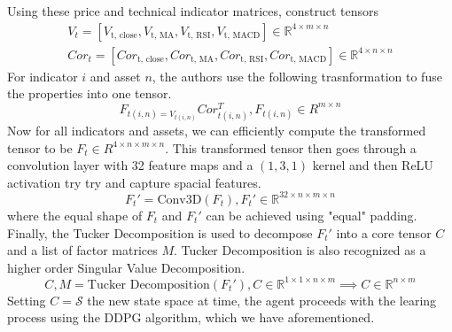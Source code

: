 Using these price and technical indicator matrices, construct tensors 
\begin{align*}
  V_t = [V_{\text{t, close}}, V_{\text{t, MA}}, V_{\text{t, RSI}}, V_{\text{t, MACD}}] \in \mathbb{R}^{4 \times m \times n}\\
  Cor_t = [Cor_{\text{t, close}}, Cor_{\text{t, MA}}, Cor_{\text{t, RSI}}, Cor_{\text{t, MACD}}] \in \mathbb{R}^{4 \times n \times n}
\end{align*}
For indicator $i$ and asset $n$, the authors use the following trasnformation to fuse the properties 
into one tensor. 
\[F_{t(i, n) = V_{t(i, n)}} Cor^T_{t(i, n)}, F_{t(i, n)} \in R^{m \times n}\]
Now for all indicators and assets, we can efficiently compute the transformed tensor to be $F_t \in R^{4 \times n \times m \times n}$.
This transformed tensor then goes through a convolution layer with 32 feature maps and a $(1, 3, 1)$ kernel and then ReLU activation try 
try and capture spacial features.
\[F_t' = \text{Conv3D}(F_t), F_t' \in \mathbb{R}^{32 \times n \times m \times n}\]
where the equal shape of $F_t$ and $F_t'$ can be achieved using "equal" padding. Finally, the Tucker Decomposition is used
to decompose $F_t'$ into a core tensor $C$ and a list of factor matrices $M$. Tucker Decomposition is also recognized as a higher order Singular Value Decomposition. 
\[C, M = \text{Tucker Decomposition}(F_t'), C \in \mathbb{R}^{1 \times 1 \times n \times m} \implies C \in \mathbb{R}^{n \times m}\]
Setting $C = \mathcal{S}$ the new state space at time, the agent proceeds with the learing process
using the DDPG algorithm, which we have aforementioned.

